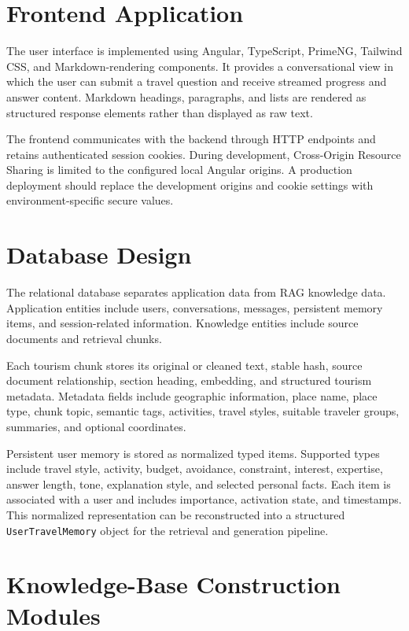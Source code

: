 \section{Frontend Application}

The user interface is implemented using Angular, TypeScript, PrimeNG, Tailwind
CSS, and Markdown-rendering components. It provides a conversational view in
which the user can submit a travel question and receive streamed progress and
answer content. Markdown headings, paragraphs, and lists are rendered as
structured response elements rather than displayed as raw text.

The frontend communicates with the backend through HTTP endpoints and retains
authenticated session cookies. During development, Cross-Origin Resource
Sharing is limited to the configured local Angular origins. A production
deployment should replace the development origins and cookie settings with
environment-specific secure values.

\section{Database Design}

The relational database separates application data from RAG knowledge data.
Application entities include users, conversations, messages, persistent memory
items, and session-related information. Knowledge entities include source
documents and retrieval chunks.

Each tourism chunk stores its original or cleaned text, stable hash, source
document relationship, section heading, embedding, and structured tourism
metadata. Metadata fields include geographic information, place name, place
type, chunk topic, semantic tags, activities, travel styles, suitable traveler
groups, summaries, and optional coordinates.

Persistent user memory is stored as normalized typed items. Supported types
include travel style, activity, budget, avoidance, constraint, interest,
expertise, answer length, tone, explanation style, and selected personal facts.
Each item is associated with a user and includes importance, activation state,
and timestamps. This normalized representation can be reconstructed into a
structured \texttt{UserTravelMemory} object for the retrieval and generation
pipeline.

\section{Knowledge-Base Construction Modules}

